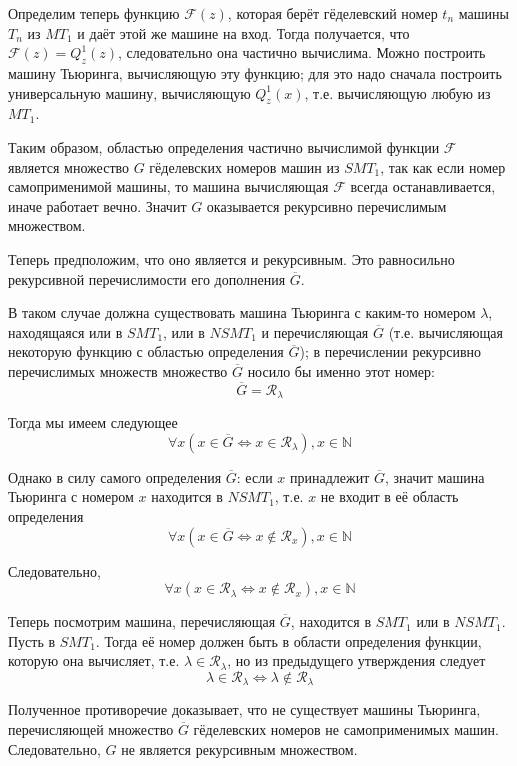 \documentclass[a4paper, 12pt]{article}  %
\theoremstyle{definition}
\begin{document}
		Определим теперь функцию $\mathscr{F}(z)$, которая берёт гёделевский номер $t_n$ машины $T_n$ из
		$MT_1$ и даёт этой же машине на вход. Тогда получается, что $\mathscr{F}(z) = Q^1_z(z)$,
		следовательно она частично вычислима. Можно построить машину Тьюринга, вычисляющую эту функцию; для
		это надо сначала построить универсальную машину, вычисляющую $Q^1_z(x)$, т.е. вычисляющую любую из
		$MT_1$.
		
		Таким образом, областью определения частично вычислимой функции $\mathscr{F}$ является множество
		$G$ гёделевских номеров машин из $SMT_1$, так как если номер самоприменимой машины, то машина
		вычисляющая $\mathscr{F}$ всегда останавливается, иначе работает вечно. Значит $G$ оказывается
		рекурсивно перечислимым множеством.
		
		Теперь предположим, что оно является и рекурсивным. Это равносильно рекурсивной перечислимости его
		дополнения $\overline{G}$.
		
		В таком случае должна существовать машина Тьюринга с каким-то номером $\lambda$, находящаяся или в
		$SMT_1$, или в $NSMT_1$ и перечисляющая $\overline{G}$ (т.е. вычисляющая некоторую функцию с
		областью определения $\overline{G}$); в перечислении рекурсивно перечислимых множеств
		множество $\overline{G}$ носило бы именно этот номер:
		$$ \overline{G} = \mathscr{R}_{\lambda} $$
		
		Тогда мы имеем следующее
		$$ \forall x ( x \in \overline{G} \Leftrightarrow  x \in \mathscr{R}_{\lambda} ), x \in \mathbb{N}$$
		
		Однако в силу самого определения $\overline{G}$: если $x$ принадлежит $\overline{G}$, значит машина
		Тьюринга с номером $x$ находится в $NSMT_1$, т.е. $x$ не входит в её область определения
		$$ \forall x (x \in \overline{G} \Leftrightarrow  x \notin \mathscr{R}_x ), x \in \mathbb{N}$$
		
		Следовательно,
		$$ \forall x (x \in \mathscr{R}_{\lambda} \Leftrightarrow  x \notin \mathscr{R}_x), x \in \mathbb{N} $$
		
		Теперь посмотрим машина, перечисляющая $\overline{G}$, находится в $SMT_1$ или в $NSMT_1$. Пусть в
		$SMT_1$. Тогда её номер должен быть в области определения функции, которую она вычисляет, т.е. 
		$\lambda \in \mathscr{R}_{\lambda}$, но из предыдущего утверждения следует 
		$$ \lambda \in \mathscr{R}_{\lambda} \Leftrightarrow  \lambda \notin \mathscr{R}_{\lambda}$$
		
		Полученное противоречие доказывает, что не существует машины Тьюринга, перечисляющей множество $\overline{G}$ гёделевских номеров не самоприменимых машин. Следовательно, $G$ не является рекурсивным множеством.
\end{document}
